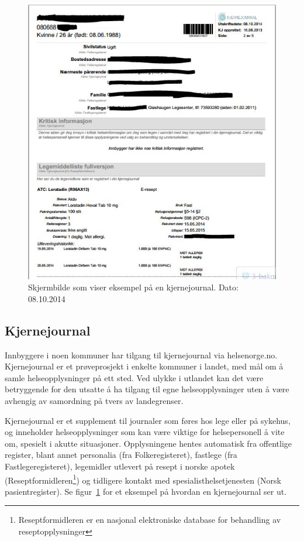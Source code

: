 \begin{figure}[H]
  \centering
    \includegraphics[width=1\textwidth]{fig/dagens/kjernejournal2.jpg}
  \caption{Skjermbilde som viser eksempel på en kjernejournal. Dato: 08.10.2014}
\label{fig:kjernejournal}
\end{figure}

\subsection{Kjernejournal}
Innbyggere i noen kommuner har tilgang til kjernejournal via helsenorge.no. Kjernejournal er et prøveprosjekt i enkelte kommuner i landet, med mål om å samle helseopplysninger på ett sted. Ved ulykke i utlandet kan det være betryggende for den utsatte å ha tilgang til egne helseopplysninger uten å være avhengig av samordning på tvers av landegrenser.

Kjernejournal er et supplement til journaler som føres hos lege eller på sykehus, og inneholder helseopplysninger som kan være viktige for helsepersonell å vite om, spesielt i akutte situasjoner. Opplysningene hentes automatisk fra offentlige register, blant annet personalia (fra Folkeregisteret), fastlege (fra Fastlegeregisteret), legemidler utlevert på resept i norske apotek (Reseptformidleren\footnote{Reseptformidleren er en nasjonal elektroniske database for behandling av reseptopplysninger}) og tidligere kontakt med spesialisthelsetjenesten (Norsk pasientregister). Se figur~\ref{fig:kjernejournal} for et eksempel på hvordan en kjernejournal ser ut.

